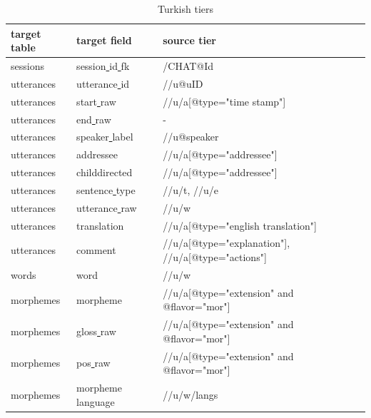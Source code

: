 \documentclass[a4paper, 11pt]{book}
\newcommand{\und}{\underline{{ }}\hspace{0.2mm}}	%
\begin{document}
\begin{table}[ht!]
	\centering
	\begin{tabular}{lll}
		\toprule
			\textbf{target table} & \textbf{target field} & \textbf{source tier} \\
		\midrule
			sessions 	& session\und id\und fk 	& /CHAT@Id \\
			utterances 	& utterance\und id	& //u@uID \\
			utterances 	& start\und raw		& //u/a[@type="time stamp"] \\
			utterances	& end\und raw		& - \\
			utterances 	& speaker\und label	& //u@speaker \\
			utterances 	& addressee			& //u/a[@type="addressee"] \\
			utterances 	& childdirected		& //u/a[@type="addressee"] \\
			utterances 	& sentence\und type	& //u/t, //u/e \\
			utterances 	& utterance\und raw	& //u/w \\
			utterances 	& translation		& //u/a[@type="english translation"] \\
			utterances 	& comment			& //u/a[@type="explanation"], //u/a[@type="actions"] \\

			words	 	& word		& //u/w \\
			morphemes	& morpheme			& //u/a[@type="extension" and @flavor="mor"] \\ %
			morphemes	& gloss\und raw		& //u/a[@type="extension" and @flavor="mor"] \\ %
			morphemes	& pos\und raw		& //u/a[@type="extension" and @flavor="mor"] \\ %
			morphemes	& morpheme\und language			& //u/w/langs \\

		\bottomrule
	\end{tabular}
	\caption{Turkish tiers}
	\label{tab:Turkish tiers}
\end{table}
\end{document}
